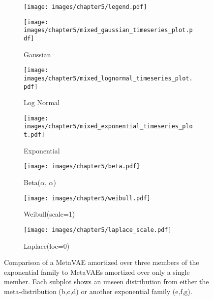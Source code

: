 \begin{figure}[h]
\centering     %
\begin{subfigure}[b]{0.9\linewidth}
    \texttt{[image: images/chapter5/legend.pdf]}
\end{subfigure}
\begin{subfigure}[b]{0.32\linewidth}
    \texttt{[image: images/chapter5/mixed\_gaussian\_timeseries\_plot.pdf]}
    \caption{Gaussian}
\end{subfigure}
\begin{subfigure}[b]{0.32\linewidth}
    \texttt{[image: images/chapter5/mixed\_lognormal\_timeseries\_plot.pdf]}
    \caption{Log Normal}
\end{subfigure}
\begin{subfigure}[b]{0.32\linewidth}
    \texttt{[image: images/chapter5/mixed\_exponential\_timeseries\_plot.pdf]}
    \caption{Exponential}
\end{subfigure}
\begin{subfigure}[b]{0.32\linewidth}
    \texttt{[image: images/chapter5/beta.pdf]}
    \caption{Beta($\alpha$, $\alpha$)}
\end{subfigure}
\begin{subfigure}[b]{0.32\linewidth}
    \texttt{[image: images/chapter5/weibull.pdf]}
    \caption{Weibull(scale=1)}
\end{subfigure}
\begin{subfigure}[b]{0.32\linewidth}
    \texttt{[image: images/chapter5/laplace\_scale.pdf]}
    \caption{Laplace(loc=0)}
\end{subfigure}
\caption{Comparison of a MetaVAE amortized over three members of the exponential family to MetaVAEs amortized over only a single member. Each subplot shows an unseen distribution from either the meta-distribution (b,c,d) or another exponential family (e,f,g).}
\label{fig:expfam_plot}
\end{figure}

